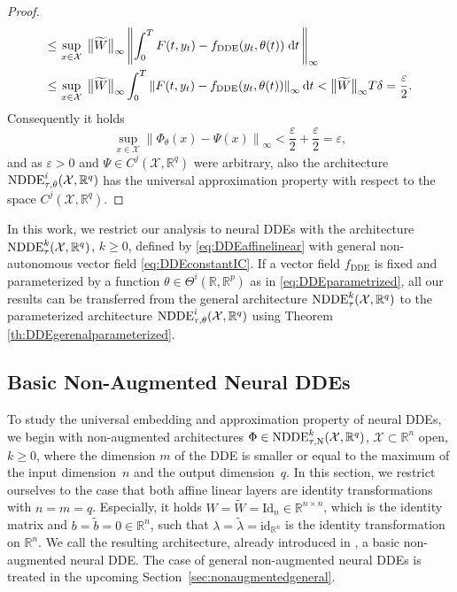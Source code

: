 \documentclass[10pt]{article}
\numberwithin{equation}{section}
\newcommand*{\dd}{\mathrm{d}}
\newcommand{\eps}{\varepsilon}
\newcommand\norm[1]{\left\lVert#1\right\rVert}
\newcommand\normm[1]{\big\lVert#1\big\lVert}
\begin{document}
\begin{proof}
\begin{align*}
			\leq \,&\sup_{x \in \mathcal{X}} \; \normm{\widetilde{W}}_\infty \norm{\int_0^T F(t,y_t) - f_\textup{DDE}(y_t,\theta(t))  \; \dd t \,  }_\infty \\
			\leq \,&\sup_{x \in \mathcal{X}} \; \normm{\widetilde{W}}_\infty \int_0^T \norm{F(t,y_t) - f_\textup{DDE}(y_t,\theta(t)) }_\infty \dd t < \normm{\widetilde{W}}_\infty T \delta = \frac{\eps}{2}.
		\end{align*}
		Consequently it holds
		\begin{equation*}
			\sup_{x \in \mathcal{X}} \norm{\Phi_\theta(x)-\Psi(x)}_\infty  < \frac{\eps}{2} + \frac{\eps}{2} = \eps,
		\end{equation*}
		and as $\eps>0$ and $\Psi\in C^j(\mathcal{X},\mathbb{R}^q)$  were arbitrary, also the architecture $\textup{NDDE}^i_{\tau,\theta}(\mathcal{X},\mathbb{R}^q)$ has the universal approximation property with respect to the space $C^j(\mathcal{X},\mathbb{R}^q)$.
	\end{proof}
	
	
	
	In this work, we restrict our analysis to neural DDEs with the architecture $\textup{NDDE}^k_\tau(\mathcal{X},\mathbb{R}^q)$, $k\geq 0$, defined by \eqref{eq:DDEaffinelinear} with general non-autonomous vector field \eqref{eq:DDEconstantIC}. If a vector field $f_\text{DDE}$ is fixed and parameterized by a function $\theta \in \Theta^i(\mathbb{R},\mathbb{R}^{p})$ as in \eqref{eq:DDEparametrized}, all our results can be transferred from the general architecture $\textup{NDDE}^k_\tau(\mathcal{X},\mathbb{R}^q)$ to the parameterized architecture $\textup{NDDE}^i_{\tau,\theta}(\mathcal{X},\mathbb{R}^q)$ using Theorem \ref{th:DDEgerenalparameterized}. 
	
	
	\subsection{Basic Non-Augmented Neural DDEs}
	\label{sec:nonaugmentedbasic}
	
	To study the universal embedding and approximation property of neural DDEs, we begin with non-augmented architectures $\Phi\in \textup{NDDE}_{\tau,\textup{N}}^k(\mathcal{X},\mathbb{R}^q)$, $\mathcal{X}\subset \mathbb{R}^n$ open, $k\geq 0$, where the dimension $m$ of the DDE is smaller or equal to the maximum of the input dimension~$n$ and the output dimension~$q$. In this section, we restrict ourselves to the case that both affine linear layers are identity transformations with $n = m = q$. Especially, it holds $W = \widetilde{W} = \text{Id}_n \in \mathbb{R}^{n \times n}$, which is the identity matrix and $b = \tilde{b} = 0 \in \mathbb{R}^n$, such that $\lambda = \tilde{\lambda}= \text{id}_{\mathbb{R}^n}$ is the identity transformation on $\mathbb{R}^n$. We call the resulting architecture, already introduced in \cite{Zhu2021}, a basic non-augmented neural DDE. The case of general non-augmented neural DDEs is treated in the upcoming Section~\ref{sec:nonaugmentedgeneral}.
	
\end{document}
